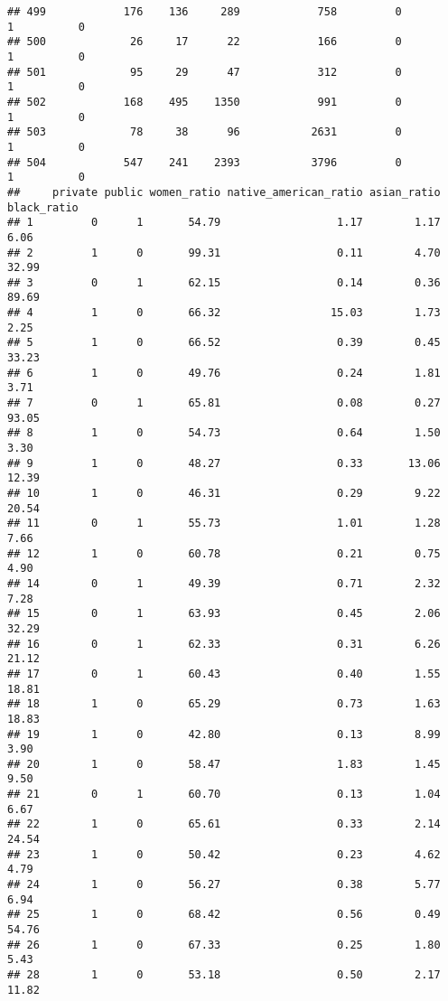 \documentclass[
]{article}
\begin{document}
\begin{verbatim}
## 499            176    136     289            758         0         1          0
## 500             26     17      22            166         0         1          0
## 501             95     29      47            312         0         1          0
## 502            168    495    1350            991         0         1          0
## 503             78     38      96           2631         0         1          0
## 504            547    241    2393           3796         0         1          0
##     private public women_ratio native_american_ratio asian_ratio black_ratio
## 1         0      1       54.79                  1.17        1.17        6.06
## 2         1      0       99.31                  0.11        4.70       32.99
## 3         0      1       62.15                  0.14        0.36       89.69
## 4         1      0       66.32                 15.03        1.73        2.25
## 5         1      0       66.52                  0.39        0.45       33.23
## 6         1      0       49.76                  0.24        1.81        3.71
## 7         0      1       65.81                  0.08        0.27       93.05
## 8         1      0       54.73                  0.64        1.50        3.30
## 9         1      0       48.27                  0.33       13.06       12.39
## 10        1      0       46.31                  0.29        9.22       20.54
## 11        0      1       55.73                  1.01        1.28        7.66
## 12        1      0       60.78                  0.21        0.75        4.90
## 14        0      1       49.39                  0.71        2.32        7.28
## 15        0      1       63.93                  0.45        2.06       32.29
## 16        0      1       62.33                  0.31        6.26       21.12
## 17        0      1       60.43                  0.40        1.55       18.81
## 18        1      0       65.29                  0.73        1.63       18.83
## 19        1      0       42.80                  0.13        8.99        3.90
## 20        1      0       58.47                  1.83        1.45        9.50
## 21        0      1       60.70                  0.13        1.04        6.67
## 22        1      0       65.61                  0.33        2.14       24.54
## 23        1      0       50.42                  0.23        4.62        4.79
## 24        1      0       56.27                  0.38        5.77        6.94
## 25        1      0       68.42                  0.56        0.49       54.76
## 26        1      0       67.33                  0.25        1.80        5.43
## 28        1      0       53.18                  0.50        2.17       11.82

\end{verbatim}
\end{document}
